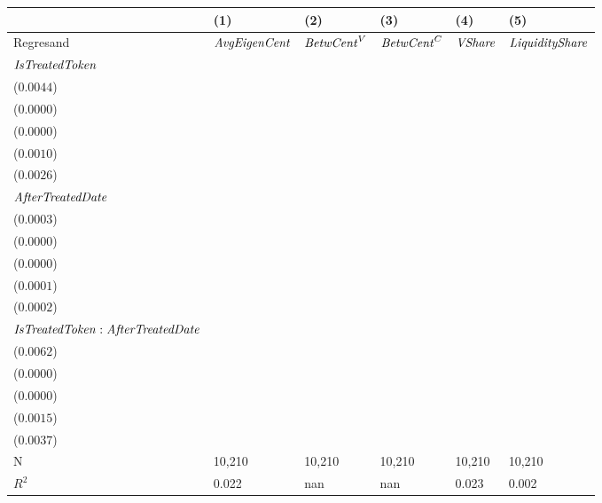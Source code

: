 \begin{tabular}{llllll}
\toprule
{} &                                       (1) &                                   (2) &                                   (3) &                                       (4) &                                      (5) \\
\midrule
Regresand                                     &                      ${\it AvgEigenCent}$ &                    ${\it BetwCent}^V$ &                    ${\it BetwCent}^C$ &                            ${\it VShare}$ &                   ${\it LiquidityShare}$ \\
${\it IsTreatedToken}$                        &   \makecell{$0.0206^{***}$ \\ ($0.0044$)} &  \makecell{$0.0000^{}$ \\ ($0.0000$)} &  \makecell{$0.0000^{}$ \\ ($0.0000$)} &   \makecell{$0.0049^{***}$ \\ ($0.0010$)} &   \makecell{$0.0055^{**}$ \\ ($0.0026$)} \\
${\it AfterTreatedDate}$                      &   \makecell{$0.0048^{***}$ \\ ($0.0003$)} &  \makecell{$0.0000^{}$ \\ ($0.0000$)} &  \makecell{$0.0000^{}$ \\ ($0.0000$)} &   \makecell{$0.0011^{***}$ \\ ($0.0001$)} &  \makecell{$0.0007^{***}$ \\ ($0.0002$)} \\
${\it IsTreatedToken}:{\it AfterTreatedDate}$ &  \makecell{$-0.0207^{***}$ \\ ($0.0062$)} &  \makecell{$0.0000^{}$ \\ ($0.0000$)} &  \makecell{$0.0000^{}$ \\ ($0.0000$)} &  \makecell{$-0.0049^{***}$ \\ ($0.0015$)} &    \makecell{$-0.0058^{}$ \\ ($0.0037$)} \\
\midrule N                                    &                                    10,210 &                                10,210 &                                10,210 &                                    10,210 &                                   10,210 \\
$R^2$                                         &                                     0.022 &                                   nan &                                   nan &                                     0.023 &                                    0.002 \\
\bottomrule
\end{tabular}
